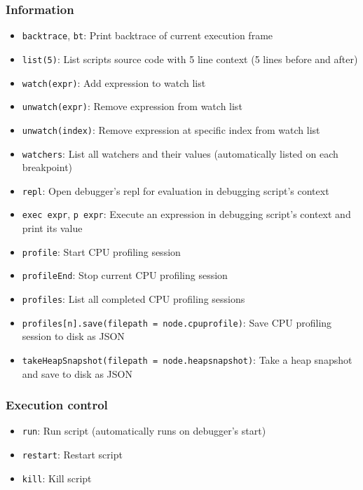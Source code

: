 \subsubsection{Information}\label{information}

\begin{itemize}
\tightlist
\item
  \texttt{backtrace}, \texttt{bt}: Print backtrace of current execution
  frame
\item
  \texttt{list(5)}: List scripts source code with 5 line context (5
  lines before and after)
\item
  \texttt{watch(expr)}: Add expression to watch list
\item
  \texttt{unwatch(expr)}: Remove expression from watch list
\item
  \texttt{unwatch(index)}: Remove expression at specific index from
  watch list
\item
  \texttt{watchers}: List all watchers and their values (automatically
  listed on each breakpoint)
\item
  \texttt{repl}: Open debugger's repl for evaluation in debugging
  script's context
\item
  \texttt{exec\ expr}, \texttt{p\ expr}: Execute an expression in
  debugging script's context and print its value
\item
  \texttt{profile}: Start CPU profiling session
\item
  \texttt{profileEnd}: Stop current CPU profiling session
\item
  \texttt{profiles}: List all completed CPU profiling sessions
\item
  \texttt{profiles{[}n{]}.save(filepath\ =\ \textquotesingle{}node.cpuprofile\textquotesingle{})}:
  Save CPU profiling session to disk as JSON
\item
  \texttt{takeHeapSnapshot(filepath\ =\ \textquotesingle{}node.heapsnapshot\textquotesingle{})}:
  Take a heap snapshot and save to disk as JSON
\end{itemize}

\subsubsection{Execution control}\label{execution-control}

\begin{itemize}
\tightlist
\item
  \texttt{run}: Run script (automatically runs on debugger's start)
\item
  \texttt{restart}: Restart script
\item
  \texttt{kill}: Kill script
\end{itemize}

